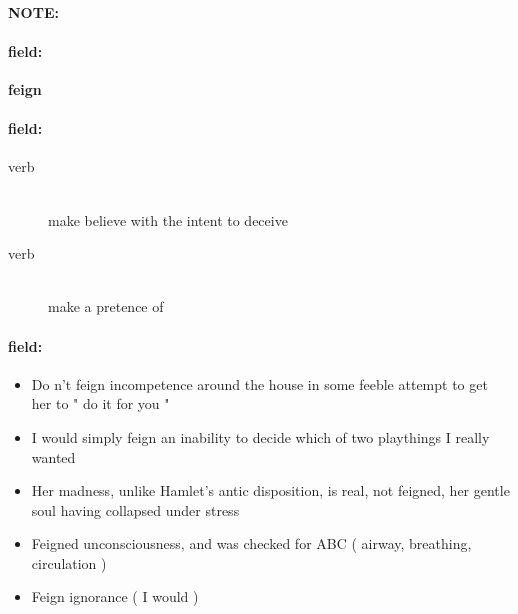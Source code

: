 \documentclass[12pt]{article}
\newenvironment{note}{\paragraph{NOTE:}}{}
\newenvironment{field}{\paragraph{field:}}{}
\begin{document}
\begin{note}
\begin{field}
\textbf{\large feign}
\end{field}


\begin{field}
\begin{description}
\item[verb] \hfill \\ 
make believe with the intent to deceive

\item[verb] \hfill \\ 
make a pretence of

\end{description}
\end{field}

\begin{field}
\begin{itemize}
\item Do n't feign incompetence around the house in some feeble attempt to get her to " do it for you " 
\item I would simply feign an inability to decide which of two playthings I really wanted
\item Her madness, unlike Hamlet's antic disposition, is real, not feigned, her gentle soul having collapsed under stress
\item Feigned unconsciousness, and was checked for ABC ( airway, breathing, circulation )
\item Feign ignorance ( I would )
\end{itemize}
\end{field}
\end{note}
\end{document}
